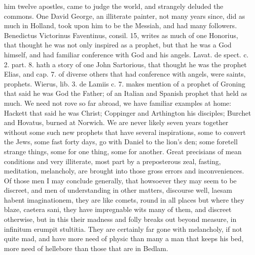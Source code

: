 {him twelve apostles, came to judge the world, and strangely deluded the
commons. One David George, an illiterate painter, not many years
since, did as much in Holland, took upon him to be the Messiah, and had
many followers. Benedictus Victorinus Faventinus, consil. 15, writes as
much of one Honorius, that thought he was not only inspired as a
prophet, but that he was a God himself, and had familiar
conference with God and his angels. Lavat. de spect. c. 2. part. 8.
hath a story of one John Sartorious, that thought he was the prophet
Elias, and cap. 7. of diverse others that had conference with angels,
were saints, prophets. Wierus, lib. 3. de Lamiis c. 7. makes mention of
a prophet of Groning that said he was God the Father; of an Italian and
Spanish prophet that held as much. We need not rove so far abroad, we
have familiar examples at home: Hackett that said he was Christ;
Coppinger and Arthington his disciples; Burchet and Hovatus,
burned at Norwich. We are never likely seven years together without
some such new prophets that have several inspirations, some to convert
the Jews, some fast forty days, go with Daniel to the lion's den; some
foretell strange things, some for one thing, some for another. Great
precisians of mean conditions and very illiterate, most part by a
preposterous zeal, fasting, meditation, melancholy, are brought into
those gross errors and inconveniences. Of those men I may conclude
generally, that howsoever they may seem to be discreet, and men of
understanding in other matters, discourse well, laesam habent
imaginationem, they are like comets, round in all places but where they
blaze, caetera sani, they have impregnable wits many of them, and
discreet otherwise, but in this their madness and folly breaks out
beyond measure, in infinitum erumpit stultitia. They are certainly far
gone with melancholy, if not quite mad, and have more need of physic
than many a man that keeps his bed, more need of hellebore than those
that are in Bedlam.

}
